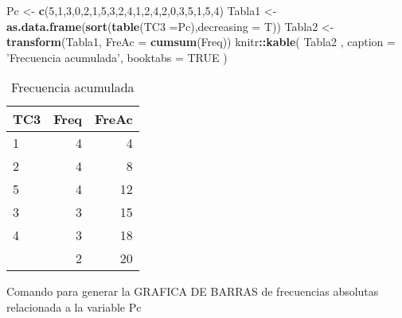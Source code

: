 \documentclass[
]{book}
\newenvironment{Shaded}{\begin{snugshade}}{\end{snugshade}}
\newcommand{\DataTypeTok}[1]{\textcolor[rgb]{0.13,0.29,0.53}{#1}}
\newcommand{\DecValTok}[1]{\textcolor[rgb]{0.00,0.00,0.81}{#1}}
\newcommand{\KeywordTok}[1]{\textcolor[rgb]{0.13,0.29,0.53}{\textbf{#1}}}
\newcommand{\NormalTok}[1]{#1}
\newcommand{\OperatorTok}[1]{\textcolor[rgb]{0.81,0.36,0.00}{\textbf{#1}}}
\newcommand{\OtherTok}[1]{\textcolor[rgb]{0.56,0.35,0.01}{#1}}
\newcommand{\StringTok}[1]{\textcolor[rgb]{0.31,0.60,0.02}{#1}}
\theoremstyle{definition}
\theoremstyle{definition}
\theoremstyle{definition}
\theoremstyle{definition}
\theoremstyle{remark}
\begin{document}
\begin{Shaded}
\begin{Highlighting}[]
\NormalTok{Pc <-}\StringTok{ }\KeywordTok{c}\NormalTok{(}\DecValTok{5}\NormalTok{,}\DecValTok{1}\NormalTok{,}\DecValTok{3}\NormalTok{,}\DecValTok{0}\NormalTok{,}\DecValTok{2}\NormalTok{,}\DecValTok{1}\NormalTok{,}\DecValTok{5}\NormalTok{,}\DecValTok{3}\NormalTok{,}\DecValTok{2}\NormalTok{,}\DecValTok{4}\NormalTok{,}\DecValTok{1}\NormalTok{,}\DecValTok{2}\NormalTok{,}\DecValTok{4}\NormalTok{,}\DecValTok{2}\NormalTok{,}\DecValTok{0}\NormalTok{,}\DecValTok{3}\NormalTok{,}\DecValTok{5}\NormalTok{,}\DecValTok{1}\NormalTok{,}\DecValTok{5}\NormalTok{,}\DecValTok{4}\NormalTok{)}
\NormalTok{Tabla1 <-}\StringTok{ }\KeywordTok{as.data.frame}\NormalTok{(}\KeywordTok{sort}\NormalTok{(}\KeywordTok{table}\NormalTok{(}\DataTypeTok{TC3 =}\NormalTok{Pc),}\DataTypeTok{decreasing =}\NormalTok{ T))}
\NormalTok{Tabla2 <-}\StringTok{ }\KeywordTok{transform}\NormalTok{(Tabla1, }\DataTypeTok{FreAc =} \KeywordTok{cumsum}\NormalTok{(Freq))}
\NormalTok{knitr}\OperatorTok{::}\KeywordTok{kable}\NormalTok{(}
\NormalTok{Tabla2 , }\DataTypeTok{caption =} \StringTok{'Frecuencia acumulada'}\NormalTok{,}
  \DataTypeTok{booktabs =} \OtherTok{TRUE}
\NormalTok{)}
\end{Highlighting}
\end{Shaded}

\begin{table}

\caption{\label{tab:Tabla3}Frecuencia acumulada}
\centering
\begin{tabular}[t]{lrr}
\toprule
TC3 & Freq & FreAc\\
\midrule
1 & 4 & 4\\
2 & 4 & 8\\
5 & 4 & 12\\
3 & 3 & 15\\
4 & 3 & 18\\
\addlinespace
0 & 2 & 20\\
\bottomrule
\end{tabular}
\end{table}

Comando para generar la GRAFICA DE BARRAS de frecuencias absolutas relacionada a la variable Pc
\end{document}

